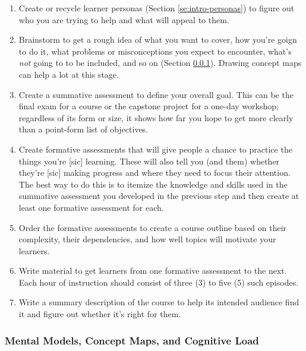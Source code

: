 \documentclass[010-intro.tex]{subfiles}
\begin{document}
        \begin{enumerate}[label=\textbf{L.\arabic*}]
            \item \label{enum:persona} Create or recycle learner personas (Section \ref{se:intro-personas})
                  to figure out who you are trying to help and what will appeal to them.
            \item \label{enum:brainstorm} Brainstorm to get a rough idea of what you want to cover,
                  how you're goign to do it,
                  what problems or misconceptions you expect to encounter,
                  what's \emph{not} going to to be included, and so on (Section \ref{sse:concept-maps}).
                  Drawing concept maps can help a lot at this stage.
            \item \label{enum:summative} Create a summative assessment to define your overall goal.
                  This can be the final exam for a course or the capstone project for a one-day workshop;
                  regardless of its form or size, it shows how far you hope to get more clearly than a point-form list of objectives.
            \item \label{enum:formative} Create formative assessments that will give people a chance to practice the things you're [sic] learning.
                  These will also tell you (and them) whether they're [sic] making progress and where they need to focus their attention.
                  The best way to do this is to itemize the knowledge and skills used in the summative assessment you developed in the previous step
                  and then create at least one formative assessment for each.
            \item \label{enum:outline} Order the formative assessments to create a course outline based on
                  their complexity, their dependencies, and how well topics will motivate your learners.
            \item \label{enum:content} Write material to get learners from one formative assessment to the next.
                  Each hour of instruction should consist of three (3) to five (5) such episodes.
            \item \label{enum:summary} Write a summary description of the course to help its intended audience find it and figure out whether it's right for them.
        \end{enumerate}

    \subsubsection{Mental Models, Concept Maps, and Cognitive Load}
        \label{sse:concept-maps}
\end{document}
